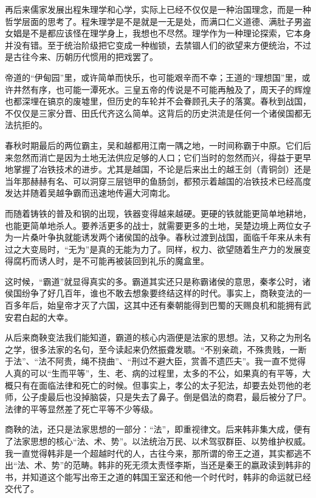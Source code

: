 \documentclass[
]{book}
\begin{document}
再后来儒家发展出程朱理学和心学，实际上已经不仅仅是一种治国理念，而是一种哲学层面的思考了。程朱理学是不是就是一无是处，而满口仁义道德、满肚子男盗女娼是不是都应该怪在理学身上，我想也不尽然。理学作为一种理论探索，它本身并没有错。至于统治阶级把它变成一种枷锁，去禁锢人们的欲望来方便统治，不过是古往今来、历朝历代惯用的把戏罢了。

帝道的``伊甸园''里，或许简单而快乐，也可能艰辛而不幸；王道的``理想国''里，或许井然有序，也可能一潭死水。三皇五帝的传说是不可能再触及了，周天子的辉煌也都深埋在镐京的废墟里，但历史的车轮并不会眷顾孔夫子的落寞。春秋到战国，不仅仅是三家分晋、田氏代齐这么简单。这背后的历史洪流是任何一个诸侯国都无法抗拒的。

春秋时期最后的两位霸主，吴和越都用江南一隅之地，一时间称霸于中原。它们后来忽然而消亡是因为土地无法供应足够的人口；它们当时的忽然而兴，得益于更早地掌握了冶铁技术的进步。尤其是越国，不论是后来出土的越王剑（青铜剑）还是当年那赫赫有名、可以洞穿三层铠甲的鱼肠剑，都预示着越国的冶铁技术已经高度发达并随着吴越争霸而迅速地传遍大河南北。

而随着铸铁的普及和钢的出现，铁器变得越来越硬。更硬的铁就能更简单地耕地，也能更简单地杀人。要养活更多的战士，就需要更多的土地，吴楚边境上两位女子为一片桑叶争执就能诱发两个诸侯国的战争。春秋过渡到战国，面临千年来从未有过之大变局时，``无为''是真的无能为力了。同样，权力、欲望随着生产力的发展变得腐朽而诱人时，是不可能再被装回到礼乐的魔盒里。

这时候，``霸道''就显得真实的多。霸道其实还只是称霸诸侯的意思，秦孝公时，诸侯国纷争了好几百年，谁也不敢去想象要终结这样的时代。事实上，商鞅变法的一百多年后，始皇帝才灭了六国，这其中还有秦朝能得到巴蜀的天赐良机和能拥有武安君白起的大幸。

从后来商鞅变法我们能知道，霸道的核心内涵便是法家的思想。法，又称之为刑名之学，很多法家的名句，至今读起来仍然振聋发聩。``不别亲疏，不殊贵贱，一断于法''、``法不阿贵，绳不挠曲''、``刑过不避大臣，赏善不遗匹夫''。我一直不觉得人真的可以``生而平等''，生、老、病的过程里，太多的不公，如果真的有平等，大概只有在面临法律和死亡的时候。但事实上，孝公的太子犯法，却要去处罚他的老师，公子虔最后也没掉脑袋，只是失去了鼻子。倒是倡法的商君，最后被分了尸。法律的平等显然差了死亡平等不少等级。

商鞅的法，还只是法家思想的一部分：``法''，即重视律文。后来韩非集大成，便有了法家思想的核心``法、术、势''。以法统治万民、以术驾驭群臣、以势维护权威。我一直觉得韩非是一个超越时代的人，古往今来，那所谓的帝王之道，其实都逃不出``法、术、势''的范畴。韩非的死无须太责怪李斯，当还是秦王的嬴政读到韩非的书，并知道这个能写出帝王之道的韩国王室还和他一个时代时，韩非的命运就已经交代了。
\end{document}
